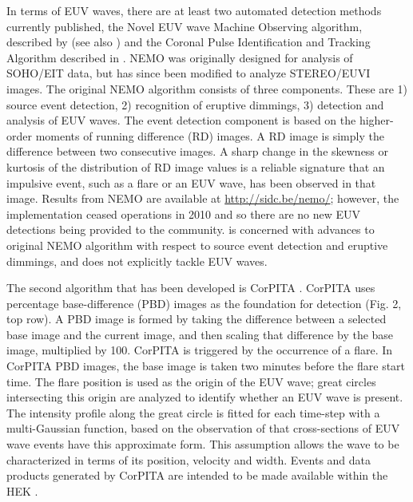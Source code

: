 \documentclass[namedreferences]{solarphysics}
\begin{document}
\begin{article}
In terms of EUV waves, there are at least two automated detection
methods currently published, the Novel EUV wave Machine Observing
algorithm, described by \cite{2005SoPh..228..265P} (see also
\cite{2012SoPh..276..479P}) and the Coronal Pulse Identification and
Tracking Algorithm described in \cite{2014SoPh..289.3279L}. NEMO was
originally designed for analysis of SOHO/EIT data, but has since been
modified to analyze STEREO/EUVI images. The original NEMO algorithm
\cite{2005SoPh..228..265P} consists of three components. These are 1)
source event detection, 2) recognition of eruptive dimmings, 3)
detection and analysis of EUV waves. The event detection component is
based on the higher-order moments of running difference (RD) images. A
RD image is simply the difference between two consecutive images. A
sharp change in the skewness or kurtosis of the distribution of RD
image values is a reliable signature that an impulsive event, such as
a flare or an EUV wave, has been observed in that image.  Results from
NEMO are available at \url{http://sidc.be/nemo/}; however, the
implementation ceased operations in 2010 and so there are no new EUV
detections being provided to the community.
\cite{2012SoPh..276..479P} is concerned with advances to original NEMO
algorithm with respect to source event detection and eruptive
dimmings, and does not explicitly tackle EUV waves.



The second algorithm that has been developed is CorPITA
\citep{2014SoPh..289.3279L}. CorPITA uses percentage base-difference
(PBD) images as the foundation for detection (Fig. 2, top row).  A PBD
image is formed by taking the difference between a selected base image
and the current image, and then scaling that difference by the base
image, multiplied by 100.  CorPITA is triggered by the occurrence of a
flare.  In CorPITA PBD images, the base image is taken two minutes
before the flare start time. The flare position is used as the origin
of the EUV wave; great circles intersecting this origin are analyzed
to identify whether an EUV wave is present. The intensity profile
along the great circle is fitted for each time-step with a
multi-Gaussian function, based on the observation of
\cite{2006ApJ...645..757W} that cross-sections of EUV wave events have
this approximate form. This assumption allows the wave to be
characterized in terms of its position, velocity and width. Events and
data products generated by CorPITA are intended to be made available
within the HEK \citep{hek2012, 2012SoPh..275...79M}.  


\end{article}
\end{document}
